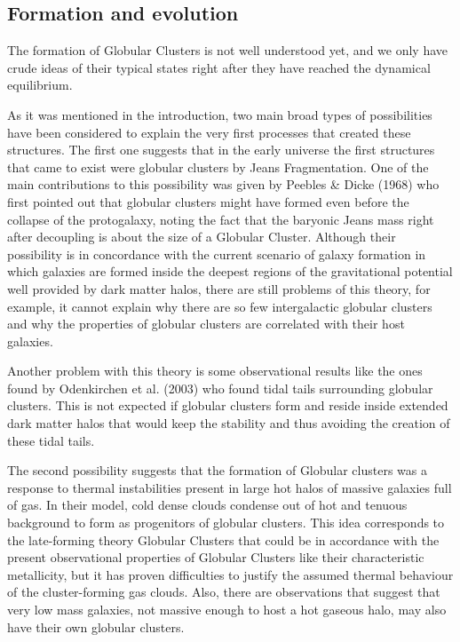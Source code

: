 \subsection{Formation and evolution}

The formation of Globular Clusters is not well understood yet, and we only have crude ideas of their typical states right after they have reached the dynamical equilibrium.

As it was mentioned in the introduction, two main broad types of possibilities have been considered to explain the very first processes that created these structures. The first one suggests that in the early universe the first structures that came to exist were globular clusters by Jeans Fragmentation. One of the main contributions to this possibility was given by Peebles \& Dicke (1968) who first pointed out that globular clusters might have formed even before the collapse of the protogalaxy, noting the fact that the baryonic Jeans mass right after decoupling is about the size of a Globular Cluster. Although their possibility is in concordance with the current scenario of galaxy formation in which galaxies are formed inside the deepest regions of the gravitational potential well provided by dark matter halos, there are still problems of this theory, for example, it cannot explain why there are so few intergalactic globular clusters and why the properties of globular clusters are correlated with their host galaxies.

Another problem with this theory is some observational results like the ones found by Odenkirchen et al. (2003) who found tidal tails surrounding globular clusters. This is not expected if globular clusters form and reside inside extended dark matter halos that would keep the stability and thus avoiding the creation of these tidal tails.

The second possibility suggests that the formation of Globular clusters was a response to thermal instabilities present in large hot halos of massive galaxies full of gas. In their model, cold dense clouds condense out of hot and tenuous background to form as progenitors of globular clusters. This idea corresponds to the late-forming theory Globular Clusters that could be in accordance with the present observational properties of Globular Clusters like their characteristic metallicity, but it has proven difficulties to justify the assumed thermal behaviour of the cluster-forming gas clouds. Also, there are observations that suggest that very low mass galaxies, not massive enough to host a hot gaseous halo, may also have their own globular clusters.

